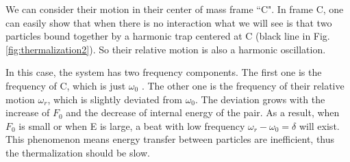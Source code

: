 \documentclass[aps,preprintnumbers,onecolumn,amsmath,amssymb,floatfix,pra]{revtex4-1}
\begin{document}
We can consider their motion in their center of mass frame ``C". In frame C, one can easily show that when there is no interaction what we will see is that two particles bound together by a harmonic trap centered at C (black line in Fig.\ref{fig:thermalization2}). So their relative motion is also a harmonic oscillation. 

In this case, the system has two frequency components. The first one is the frequency of C, which is just $\omega_0$ . The other one is the frequency of their relative motion $\omega_r$, which is slightly deviated from $\omega_0$. The deviation grows with the increase of $F_0$ and the decrease of internal energy of the pair. As a result, when $F_0$ is small or when E is large, a beat with low frequency $\omega_r-\omega_0=\delta$ will exist. This phenomenon means energy transfer between particles are inefficient, thus the thermalization should be slow. 
\end{document}
